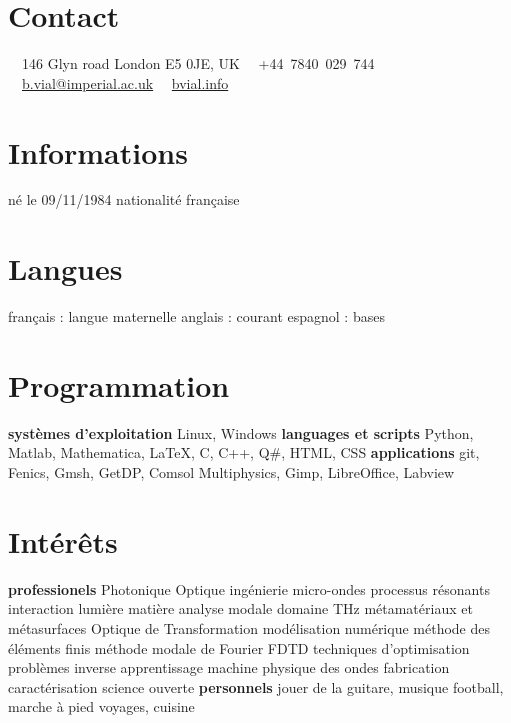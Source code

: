 \documentclass{cv}
\begin{document}



\begin{aside} %
	\section{Contact}
	\faHome~~146 Glyn road
	London E5 0JE, UK
	\faPhone~~+44~7840~029~744
	\faEnvelope~~\href{mailto:b.vial@imperial.ac.uk}{b.vial@imperial.ac.uk}
	\faUser~~\href{http://bvial.info/}{bvial.info}
	\section{Informations}
	né le 09/11/1984
	nationalité française
	\section{Langues}
	français : langue maternelle
	anglais : courant
	espagnol : bases
	\section{Programmation}
	\textbf{systèmes d'exploitation}
	Linux, Windows
	\textbf{languages et scripts}
	Python, Matlab, Mathematica, \LaTeX, C, C++, Q\#, HTML, CSS
	\textbf{applications}
	git, Fenics, Gmsh, GetDP, Comsol Multiphysics, Gimp, LibreOffice, Labview
	\section{Intérêts}
	\textbf{professionels}
	Photonique
	Optique
	ingénierie micro-ondes
	processus résonants
	interaction lumière matière
	analyse modale
	domaine THz
	métamatériaux et métasurfaces
	Optique de Transformation
	modélisation numérique
	méthode des éléments finis
	méthode modale de Fourier
	FDTD
	techniques d'optimisation
	problèmes inverse
	apprentissage machine
	physique des ondes
	fabrication
	caractérisation
	science ouverte
	\textbf{personnels}
	jouer de la guitare, musique
	football, marche à pied
	voyages, cuisine
\end{aside}
\end{document}
